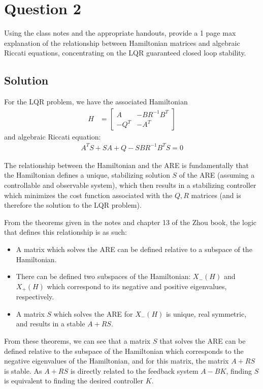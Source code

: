 \documentclass[]{article}
\begin{document}
\section{Question 2}
\noindent Using the class notes and the appropriate handouts, provide a 1 page max explanation of the relationship between Hamiltonian matrices and algebraic Riccati equations, concentrating on the LQR guaranteed closed loop stability.

\subsection{Solution}

\noindent For the LQR problem, we have the associated Hamiltonian
\begin{align*}
	\textit{H} &= \begin{bmatrix}
	A & -BR^{-1}B^T \\
	-Q^T & -A^T
	\end{bmatrix}
\end{align*}
\noindent and algebraic Riccati equation:
\begin{align*}
	A^TS + SA + Q - SBR^{-1}B^TS = 0
\end{align*}

\noindent The relationship between the Hamiltonian and the ARE is fundamentally that the Hamiltonian defines a unique, stabilizing solution $S$ of the ARE (assuming a controllable and observable system), which then results in a stabilizing controller which minimizes the cost function associated with the $Q,R$ matrices (and is therefore the solution to the LQR problem).

\noindent From the theorems given in the notes and chapter 13 of the Zhou book, the logic that defines this relationship is as such:

\begin{itemize}
	\item A matrix which solves the ARE can be defined relative to a subspace of the Hamiltonian. 
	\item There can be defined two subspaces of the Hamiltonian: $X_{-}(H)$ and $X_{+}(H)$ which correspond to its negative and positive eigenvalues, respectively.
	\item A matrix $S$ which solves the ARE for $X_{-}(H)$ is unique, real symmetric, and results in a stable $A+RS$.
\end{itemize}
\noindent From these theorems, we can see that a matrix $S$ that solves the ARE can be defined relative to the subspace of the Hamiltonian which corresponds to the negative eigenvalues of the Hamiltonian, and for this matrix, the matrix $A+RS$ is stable.
As $A+RS$ is directly related to the feedback system $A-BK$, finding $S$ is equivalent to finding the desired controller $K$.
\end{document}
